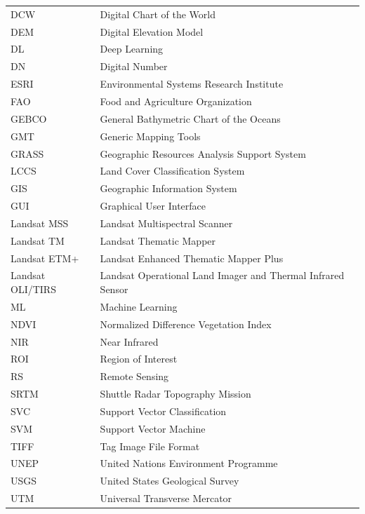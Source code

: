 \documentclass[earth,article,submit,pdftex,moreauthors]{Definitions/mdpi}
\begin{document}
{{\noindent 
\begin{tabular}{@{}ll}
DCW & Digital Chart of the World \\
DEM & Digital Elevation Model \\ 
{DL} & {Deep Learning} \\
{DN} & {Digital Number} \\
ESRI & Environmental Systems Research Institute \\
FAO & Food and Agriculture Organization \\
GEBCO & General Bathymetric Chart of the Oceans \\ 
GMT & Generic Mapping Tools \\
GRASS & Geographic Resources Analysis Support System \\
LCCS & Land Cover Classification System \\
GIS & Geographic Information System \\
{GUI} & {Graphical User Interface} \\
Landsat MSS  & Landsat Multispectral Scanner  \\
Landsat TM & Landsat Thematic Mapper \\
Landsat ETM+ & Landsat Enhanced Thematic Mapper Plus \\
Landsat OLI/TIRS & Landsat Operational Land Imager and Thermal Infrared Sensor \\
{ML} & {Machine Learning} \\
NDVI & Normalized Difference Vegetation Index \\
NIR & Near Infrared \\
{ROI} & {Region of Interest} \\
{RS} & {Remote Sensing} \\
SRTM & Shuttle Radar Topography Mission \\
{SVC} & {Support Vector Classification} \\
{SVM} & {Support Vector Machine} \\
TIFF & Tag Image File Format\\
UNEP & United Nations Environment Programme \\
USGS & United States Geological Survey\\
UTM & Universal Transverse Mercator \\
\end{tabular}
}

\appendixstart
\appendix
}
\end{document}
